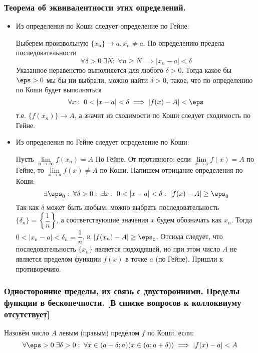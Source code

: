 \documentclass[12pt, a4paper]{article}
\begin{document}
	\subsubsection{Теорема об эквивалентности этих определений.} 
	\begin{itemize}
		\item
		Из определения по Коши следует определение по Гейне:

		Выберем произвольную $\{x_n\} \to a, x_n \neq a$. По определению предела последовательности 
		\begin{equation*}
			\forall \delta > 0 \; \exists N: \; \forall n \geq N \implies |x_n - a| < \delta
		\end{equation*}
		Указанное неравенство выполняется для любого $\delta > 0$. Тогда какое бы $\eps > 0$ мы бы ни выбрали, можно найти $\delta > 0$, такое, что по определению по Коши будет выполняться
		\begin{equation*}
			\forall x: \; 0 < |x - a| < \delta \implies |f(x) - A| < \eps
		\end{equation*}
		т.е. $\{f(x_n)\} \to A$, а значит из сходимости по Коши следует сходимость по Гейне.

		\item
		Из определения по Гейне следует определение по Коши:

		Пусть $\lim\limits_{n \to \infty} f(x_n) = A$ По Гейне. От противного: если $\lim\limits_{x \to a} f(x) = A$ по Гейне, то $\lim\limits_{x \to a} f(x) \neq A$ по Коши. Напишем отрицание определения по Коши:
		\begin{equation*}
			\exists \eps_0: \; \forall \delta > 0: \; \exists x: \; 0 < |x - a| < \delta: \; |f(x) - A| \geq \eps_0
		\end{equation*}
		Так как $\delta$ может быть любым, можно выбрать последовательность $\{\delta_n\} = \left\{\dfrac{1}{n}\right\}$, а соответствующие значения $x$ будем обозначать как $x_n$. Тогда $0 < |x_n - a| < \delta_n = \dfrac{1}{n}$, и $|f(x_n) - A| \geq \eps_0$. Отсюда следует, что последовательность $\{x_n\}$ является подходящей, но при этом число $A$ не является пределом функции $f(x)$ в точке $a$ (по Гейне). Пришли к противоречию.
	\end{itemize}

	\subsubsection{Односторонние пределы, их связь с двусторонними. Пределы функции в бесконечности. [В списке вопросов к коллоквиуму отсутствует]}
	Назовём число $A$ левым (правым) пределом $f$ по Коши, если:
	\begin{equation*}
		\forall \eps > 0 \; \exists \delta > 0: \; \forall x \in (a - \delta; a) (x \in (a; a + \delta)) \implies |f(x) - a| < A
	\end{equation*}
\end{document}
